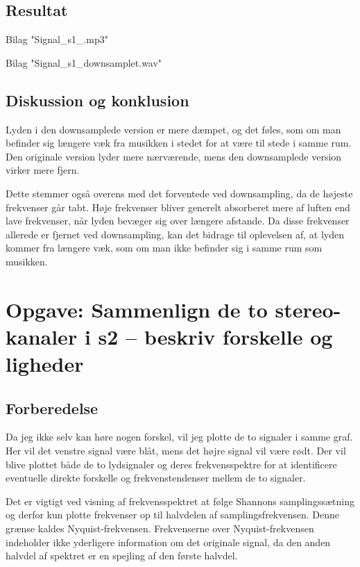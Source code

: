 \documentclass[11pt,a4paper]{report}
\begin{document}
\subsection{Resultat}
Bilag "Signal\_s1\_.mp3"

Bilag "Signal\_s1\_downsamplet.wav"

\subsection{Diskussion og konklusion}
Lyden i den downsamplede version er mere dæmpet, og det føles, som om man befinder sig længere væk fra musikken i stedet for at være til stede i samme rum. Den originale version lyder mere nærværende, mens den downsamplede version virker mere fjern.

Dette stemmer også overens med det forventede ved downsampling, da de højeste frekvenser går tabt. Høje frekvenser bliver generelt absorberet mere af luften end lave frekvenser, når lyden bevæger sig over længere afstande. Da disse frekvenser allerede er fjernet ved downsampling, kan det bidrage til oplevelsen af, at lyden kommer fra længere væk, som om man ikke befinder sig i samme rum som musikken.


\newpage
\section{Opgave: Sammenlign de to stereo-kanaler i s2 – beskriv forskelle og ligheder}

\subsection{Forberedelse}
Da jeg ikke selv kan høre nogen forskel, vil jeg plotte de to signaler i samme graf. Her vil det venstre signal være blåt, mens det højre signal vil være rødt. Der vil blive plottet både de to lydsignaler og deres frekvensspektre for at identificere eventuelle direkte forskelle og frekvenstendenser mellem de to signaler.

Det er vigtigt ved visning af frekvensspektret at følge Shannons samplingssætning og derfor kun plotte frekvenser op til halvdelen af samplingsfrekvensen. Denne grænse kaldes Nyquist-frekvensen. Frekvenserne over Nyquist-frekvensen indeholder ikke yderligere information om det originale signal, da den anden halvdel af spektret er en spejling af den første halvdel.
\end{document}
